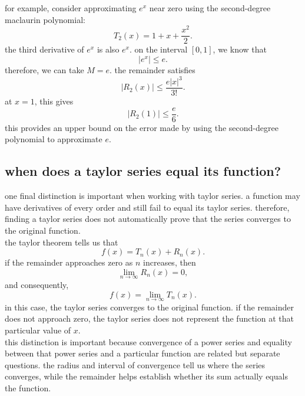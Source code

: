 \documentclass{article}
\begin{document}
for example, consider approximating $e^x$ near zero using the second-degree maclaurin polynomial:
\[
T_2(x)=1+x+\frac{x^2}{2}.
\]
the third derivative of $e^x$ is also $e^x$. on the interval $[0,1]$, we know that
\[
|e^x|\leq e.
\]
therefore, we can take $M=e$. the remainder satisfies
\[
|R_2(x)|
\leq
\frac{e|x|^3}{3!}.
\]
at $x=1$, this gives
\[
|R_2(1)|\leq\frac{e}{6}.
\]
this provides an upper bound on the error made by using the second-degree polynomial to approximate $e$.\\

\subsection{when does a taylor series equal its function?}

one final distinction is important when working with taylor series. a function may have derivatives of every order and still fail to equal its taylor series. therefore, finding a taylor series does not automatically prove that the series converges to the original function.\\

the taylor theorem tells us that
\[
f(x)=T_n(x)+R_n(x).
\]
if the remainder approaches zero as $n$ increases, then
\[
\lim_{n\to\infty}R_n(x)=0,
\]
and consequently,
\[
f(x)=\lim_{n\to\infty}T_n(x).
\]
in this case, the taylor series converges to the original function. if the remainder does not approach zero, the taylor series does not represent the function at that particular value of $x$.\\

this distinction is important because convergence of a power series and equality between that power series and a particular function are related but separate questions. the radius and interval of convergence tell us where the series converges, while the remainder helps establish whether its sum actually equals the function.\\
\end{document}
